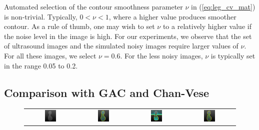 Automated selection of the contour smoothness parameter $\nu$ in (\ref{eq:leg_cv_mat}) is non-trivial. Typically, $0<\nu<1$, where a higher value produces smoother contour. As a rule of thumb, one may wish to set $\nu$ to a relatively higher value if the noise level in the image is high. For our experiments, we observe that the set of ultrasound images and the simulated noisy images require larger values of $\nu$. For all these images, we select $\nu=0.6$. For the less noisy images, $\nu$ is typically set in the range 0.05 to 0.2. 
 
\subsection{Comparison with GAC and Chan-Vese}
\begin{figure}[th]
\centering
\renewcommand{\tabcolsep}{0.05cm}
\begin{tabular}{@{}cccc@{}}
\includegraphics[width=0.24\textwidth]{images/L2S_compare/orig_2}	&
\includegraphics[width=0.24\textwidth]{images/L2S_compare/GAC_2}	&
\includegraphics[width=0.24\textwidth]{images/L2S_compare/CV_2}		&
\includegraphics[width=0.24\textwidth]{images/L2S_compare/L2S_2}	

\end{tabular}
\end{figure}
